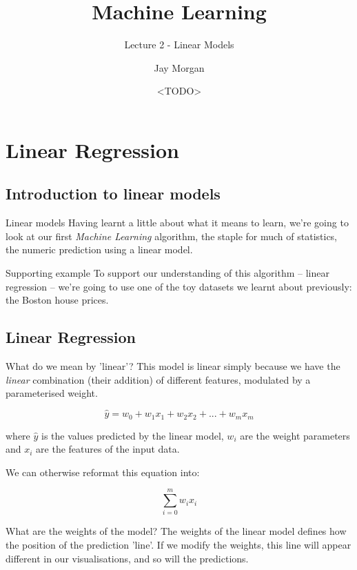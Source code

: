 \documentclass[10pt]{beamer}
\author{Jay Morgan}
\date{<TODO>}
\title{Machine Learning}
\subtitle{Lecture 2 - Linear Models}
\begin{document}
\maketitle

\section*{Linear Regression}
\label{sec:org262e8e8}

\subsection*{Introduction to linear models}
\label{sec:orgf0c7a57}

\begin{frame}[label={sec:org90d2409}]{Linear models}
Having learnt a little about what it means to learn, we're going to look at our first
\emph{Machine Learning} algorithm, the staple for much of statistics, the numeric prediction
using a linear model.
\end{frame}

\begin{frame}[label={sec:org702e797}]{Supporting example}
To support our understanding of this algorithm -- linear regression -- we're going to
use one of the toy datasets we learnt about previously: the Boston house prices.
\end{frame}

\subsection*{Linear Regression}
\label{sec:org83b91e5}

\begin{frame}[label={sec:org6e8dbd8}]{What do we mean by 'linear'?}
This model is linear simply because we have the \emph{linear} combination (their addition)
of different features, modulated by a parameterised weight.

\[ \hat{y} = w_0 + w_1 x_1 + w_2 x_2 + ... + w_m x_m \]

where \(\hat{y}\) is the values predicted by the linear model, \(w_i\) are the weight
parameters and \(x_i\) are the features of the input data.

We can otherwise reformat this equation into:

\[ \sum_{i = 0}^{m} w_i x_i \]
\end{frame}

\begin{frame}[label={sec:orgb3f63ab}]{What are the weights of the model?}
The weights of the linear model defines how the position of the prediction 'line'. If
we modify the weights, this line will appear different in our visualisations, and so
will the predictions.

\end{frame}
\end{document}
